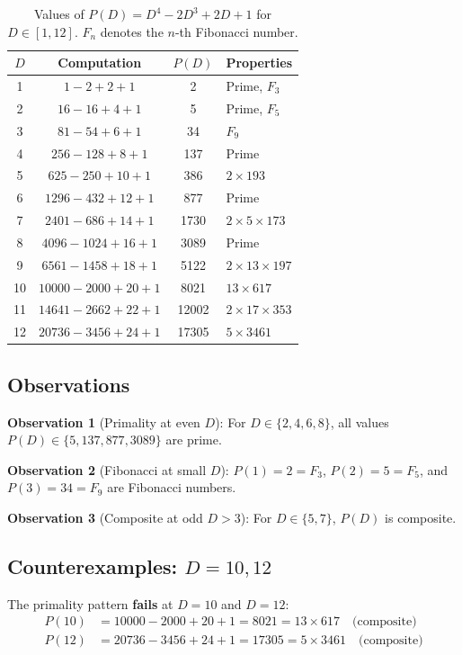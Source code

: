 \documentclass[11pt,a4paper]{article}
\begin{document}
\begin{table}[h]
\centering
\begin{tabular}{|c|c|c|l|}
\hline
$D$ & Computation & $P(D)$ & Properties \\
\hline
1 & $1 - 2 + 2 + 1$ & 2 & Prime, $F_3$ \\
2 & $16 - 16 + 4 + 1$ & 5 & Prime, $F_5$ \\
3 & $81 - 54 + 6 + 1$ & 34 & $F_9$ \\
4 & $256 - 128 + 8 + 1$ & 137 & Prime \\
5 & $625 - 250 + 10 + 1$ & 386 & $2 \times 193$ \\
6 & $1296 - 432 + 12 + 1$ & 877 & Prime \\
7 & $2401 - 686 + 14 + 1$ & 1730 & $2 \times 5 \times 173$ \\
8 & $4096 - 1024 + 16 + 1$ & 3089 & Prime \\
9 & $6561 - 1458 + 18 + 1$ & 5122 & $2 \times 13 \times 197$ \\
10 & $10000 - 2000 + 20 + 1$ & 8021 & $13 \times 617$ \\
11 & $14641 - 2662 + 22 + 1$ & 12002 & $2 \times 17 \times 353$ \\
12 & $20736 - 3456 + 24 + 1$ & 17305 & $5 \times 3461$ \\
\hline
\end{tabular}
\caption{Values of $P(D) = D^4 - 2D^3 + 2D + 1$ for $D \in [1,12]$. $F_n$ denotes the $n$-th Fibonacci number.}
\end{table}

\subsection{Observations}

\textbf{Observation 1} (Primality at even $D$): For $D \in \{2, 4, 6, 8\}$, all values $P(D) \in \{5, 137, 877, 3089\}$ are prime.

\textbf{Observation 2} (Fibonacci at small $D$): $P(1) = 2 = F_3$, $P(2) = 5 = F_5$, and $P(3) = 34 = F_9$ are Fibonacci numbers.

\textbf{Observation 3} (Composite at odd $D > 3$): For $D \in \{5, 7\}$, $P(D)$ is composite.

\subsection{Counterexamples: $D = 10, 12$}

The primality pattern \textbf{fails} at $D = 10$ and $D = 12$:
\begin{align}
P(10) &= 10000 - 2000 + 20 + 1 = 8021 = 13 \times 617 \quad \text{(composite)} \\
P(12) &= 20736 - 3456 + 24 + 1 = 17305 = 5 \times 3461 \quad \text{(composite)}
\end{align}
\end{document}
